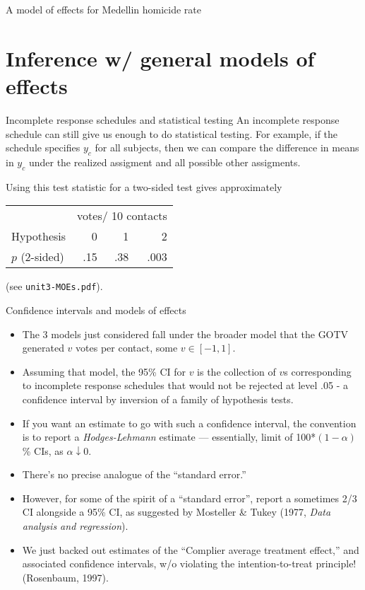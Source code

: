 \begin{frame}{A model of effects for Medellin homicide rate}
  
\end{frame}

\section{Inference w/ general models of effects}
\begin{frame}{Incomplete response schedules and statistical testing}
   An incomplete response schedule can still give us enough to do statistical testing. For example, if the schedule specifies $y_c$ for all subjects, then we can compare the difference in means in $y_c$ under the realized assigment and all possible other assigments.  

Using this test statistic for a two-sided test gives approximately

\begin{center}
\begin{tabular}{l|rrr} \hline
& \multicolumn{3}{c}{votes/ 10 contacts}\\ 
  Hypothesis & 0 & 1 & 2 \\ \hline
$p$ (2-sided) & .15 & .38 & .003 \\ \hline 
\end{tabular}
\end{center}

(see \texttt{unit3-MOEs.pdf}).
\end{frame}

\begin{frame}{Confidence intervals and models of effects}

  \begin{itemize}[<+->]
  \item The 3 models just considered fall under the broader model that the GOTV  
generated $v$ votes per contact, some $v \in [-1, 1]$.
\item Assuming that model, the 95\% CI for $v$ is the collection of $v$s corresponding to incomplete response schedules that would not be rejected at level .05 - a confidence interval by inversion of a family of hypothesis tests.
\item If you want an estimate to go with such a confidence interval, the convention is to report a \textit{Hodges-Lehmann} estimate --- essentially, limit of 100*$(1-\alpha)$\% CIs, as $\alpha \downarrow 0$.
\item There's no precise analogue of the ``standard error.''
\item However, for some of the spirit of a ``standard error'', report a sometimes 2/3 CI alongside a 95\% CI, as suggested by Mosteller \& Tukey (1977, \textit{Data analysis and regression}).
\item We just backed out estimates of the ``Complier average treatment effect,'' and associated confidence intervals, w/o violating the intention-to-treat principle! (Rosenbaum, 1997).
  \end{itemize}


\end{frame}

